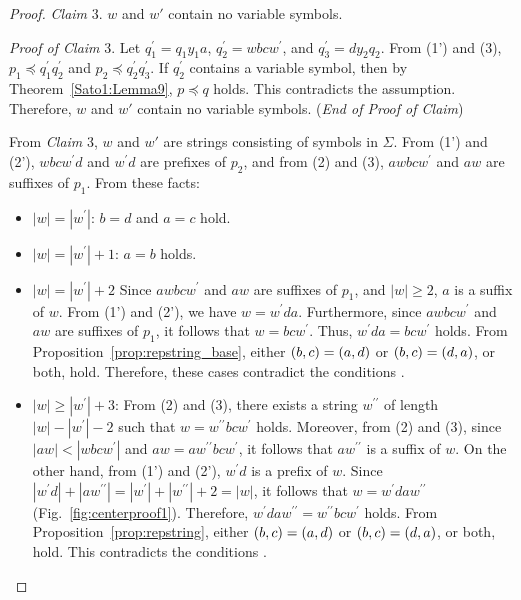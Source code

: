 \begin{proof}
  \smallskip

  \noindent
  \textit{Claim} 3. $w$ and $w'$ contain no variable symbols.

  \smallskip
  \noindent
  \textit{Proof of Claim} 3.
  Let $q_{1}^{\prime} = q_{1}y_{1}a$, $q_{2}^{\prime} = wbcw^{\prime}$, and $q_{3}^{\prime} = dy_{2}q_{2}$.
  From (1') and (3), $p_{1} \preceq q^{\prime}_{1}q^{\prime}_{2}$ and $p_{2} \preceq q^{\prime}_{2}q^{\prime}_{3}$.
  If $q_{2}^{\prime}$ contains a variable symbol, then by Theorem~\ref{Sato1:Lemma9}, $p \preceq q$ holds.
  This contradicts the assumption.
  Therefore, $w$ and $w'$ contain no variable symbols.
  (\textit{End of Proof of Claim})

  \smallskip

  From \textit{Claim} 3, $w$ and $w'$ are strings consisting of symbols in $\Sigma$.
  From (1') and (2'), $wbcw^{\prime}d$ and $w^{\prime}d$ are prefixes of $p_{2}$, and from (2) and (3), $awbcw^{\prime}$ and $aw$ are suffixes of $p_{1}$.
  From these facts:
\begin{itemize}
  \item $|w|=|w^{\prime}|$: $b = d$ and $a = c$ hold.
  \item $|w|=|w^{\prime}|+1$: $a = b$ holds.
  \item $|w| = |w^{\prime}|+2$ Since $awbcw^{\prime}$ and $aw$ are suffixes of $p_{1}$, and $|w|\geq 2$, $a$ is a suffix of $w$.
  From (1') and (2'), we have $w=w^{\prime}da$.
  Furthermore, since $awbcw^{\prime}$ and $aw$ are suffixes of $p_{1}$, it follows that $w=bcw^{\prime}$.
  Thus, $w^{\prime}da = bcw^{\prime}$ holds.
  From Proposition~\ref{prop:repstring_base}, either $(b,c) = (a,d)$ or $(b,c) = (d,a)$, or both, hold.
  Therefore, these cases contradict the conditions \TheConditionA.
  \item $|w| \ge |w^{\prime}|+3$: From (2) and (3), there exists a string $w^{\prime\prime}$ of length $|w|-|w^{\prime}|-2$ such that $w=w^{\prime\prime}bcw^{\prime}$ holds.
  Moreover, from (2) and (3), since $|aw| < |wbcw^{\prime}|$ and $aw = aw^{\prime\prime}bcw^{\prime}$, it follows that $aw^{\prime\prime}$ is a suffix of $w$.
  On the other hand, from (1') and (2'), $w^{\prime}d$ is a prefix of $w$.
  Since $|w^{\prime}d| + |aw^{\prime\prime}| = |w^{\prime}| + |w^{\prime\prime}| + 2 = |w|$, it follows that $w=w^{\prime}daw^{\prime\prime}$ (Fig.~\ref{fig:centerproof1}).
  Therefore, $w^{\prime}daw^{\prime\prime} = w^{\prime\prime}bcw^{\prime}$ holds.
  From Proposition~\ref{prop:repstring}, either $(b,c) = (a,d)$ or $(b,c) = (d,a)$, or both, hold.
  This contradicts the conditions \TheConditionA.
\end{itemize}


\end{proof}
